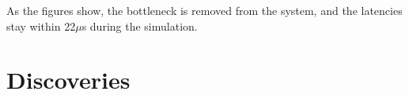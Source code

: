As the figures show, the bottleneck is removed from the system, and the latencies stay within 22$\mu$s during the simulation.

\section{Discoveries}




